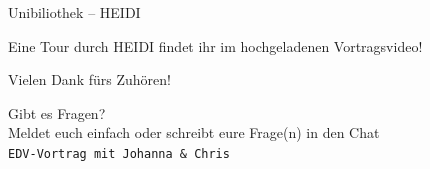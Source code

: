 \begin{frame}{Unibiliothek -- HEIDI}
    \vspace{6em}
    \begin{center}
        \Large Eine Tour durch HEIDI findet ihr im hochgeladenen Vortragsvideo!
    \end{center}
\end{frame}

\begin{frame}{Vielen Dank fürs Zuhören!}
    \vfill
    \begin{center}
        \Huge Gibt es Fragen? \\[12pt]
        \large Meldet euch einfach oder schreibt eure Frage(n) in den Chat \\[20pt]
        \normalsize \texttt{EDV-Vortrag mit Johanna \& Chris}
    \end{center}
\end{frame}


